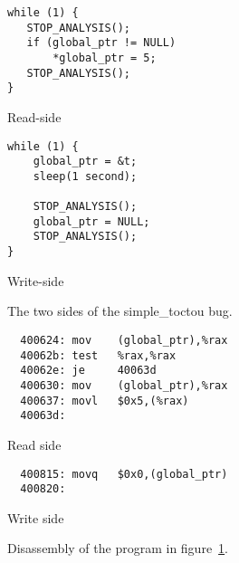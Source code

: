 

\begin{figure}
  \begin{subfloat}
    \begin{minipage}{50mm}
\begin{verbatim}
while (1) {
   STOP_ANALYSIS();
   if (global_ptr != NULL)
       *global_ptr = 5;
   STOP_ANALYSIS();
}
\end{verbatim}
    \end{minipage}
    \caption{Read-side}
  \end{subfloat}
  \begin{subfloat}
    \begin{minipage}{50mm}
\begin{verbatim}
while (1) {
    global_ptr = &t;
    sleep(1 second);

    STOP_ANALYSIS();
    global_ptr = NULL;
    STOP_ANALYSIS();
}
\end{verbatim}
    \end{minipage}
    \caption{Write-side}
  \end{subfloat}
  \label{fig:eval:simple_toctou}
  \caption{The two sides of the simple\_toctou bug.}
\end{figure}

\begin{figure}
  \begin{subfloat}
    \begin{minipage}{70mm}
\begin{verbatim}
  400624: mov    (global_ptr),%rax
  40062b: test   %rax,%rax
  40062e: je     40063d
  400630: mov    (global_ptr),%rax
  400637: movl   $0x5,(%rax)
  40063d:
\end{verbatim}
    \end{minipage}
    \caption{Read side}
  \end{subfloat}
  \begin{subfloat}
    \begin{minipage}{70mm}
\begin{verbatim}
  400815: movq   $0x0,(global_ptr)
  400820:
\end{verbatim}
    \end{minipage}
    \caption{Write side}
  \end{subfloat}
  \label{fig:eval:simple_toctou_compiled}
  \caption{Disassembly of the program in figure~\ref{fig:eval:simple_toctou}.}
\end{figure}

